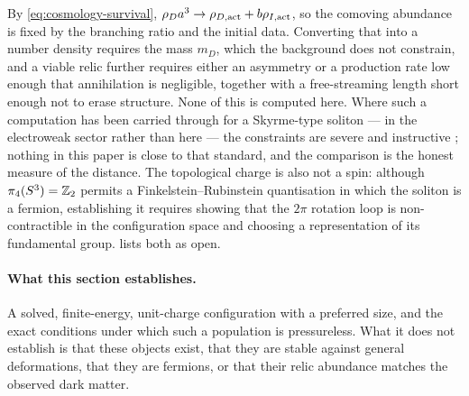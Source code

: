By \cref{eq:cosmology-survival}, $\rho_{D} a^3\to\rho_{D,\rm act}+b\rho_{I,\rm act}$,
so the comoving abundance is fixed by the branching ratio and the initial
data. Converting that into a number density requires the mass $m_D$, which the
background does not constrain, and a viable relic further requires either an
asymmetry or a production rate low enough that annihilation is negligible,
together with a free-streaming length short enough not to erase structure. None
of this is computed here. Where such a computation has been carried through for
a Skyrme-type soliton --- in the electroweak sector rather than here --- the
constraints are severe and instructive
\parencite{kitano2016_160507355}; nothing in this paper is close to that
standard, and the comparison is the honest measure of the distance. The topological charge is also not a spin: although
$\pi_4(S^3)=\mathbb{Z}_2$ permits a Finkelstein--Rubinstein quantisation in which the
soliton is a fermion, establishing it requires showing that the $2\pi$ rotation
loop is non-contractible in the configuration space and choosing a
representation of its fundamental group.  lists both as open.

\paragraph{What this section establishes.}
A solved, finite-energy, unit-charge configuration with a preferred size, and
the exact conditions under which such a population is pressureless. What it
does not establish is that these objects exist, that they are stable against
general deformations, that they are fermions, or that their relic abundance
matches the observed dark matter.
